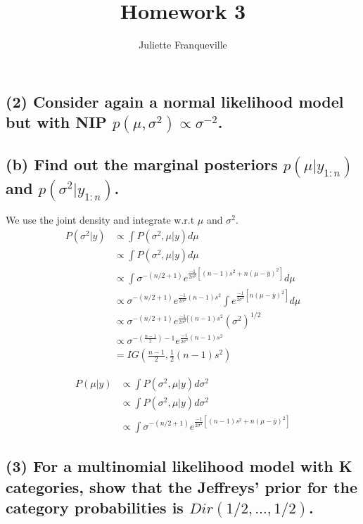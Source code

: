 \documentclass[11pt]{article}
\begin{document}
 
\title{Homework 3}
\author{Juliette Franqueville\\
}
\maketitle

\subsection*{(2) Consider again a normal likelihood model but with NIP $p(\mu, \sigma^2) \propto \sigma^{-2}$.}

\subsection*{(b) Find out the marginal posteriors $p(\mu |y_{1:n})$ and $p(\sigma^2 |y_{1:n})$.}

We use the joint density and integrate w.r.t $\mu$ and $\sigma^2$.
\begin{align*}
    P(\sigma^2|y) &\propto \int P(\sigma^2, \mu|y)d\mu \\
    &\propto \int P(\sigma^2, \mu|y)d\mu \\
    &\propto \int \sigma^{-(n/2 + 1)}e^{\frac{-1}{2\sigma^2}[(n-1)s^2+n(\mu-\bar{y})^2]}d\mu \\
    &\propto \sigma^{-(n/2 + 1)}e^{\frac{-1}{2\sigma^2}(n-1)s^2} \int e^{\frac{-1}{2\sigma^2}[n(\mu-\bar{y})^2]}d\mu \\
     &\propto \sigma^{-(n/2 + 1)}e^{\frac{-1}{2\sigma^2}[(n-1)s^2} (\sigma^2)^{1/2} \\
     &\propto \sigma^{-\left(\frac{n-1}{2}\right)- 1}e^{\frac{-1}{2\sigma^2}(n-1)s^2}\\
     &= IG\left( \frac{n-1}{2}, \frac{1}{2}(n-1)s^2\right)
\end{align*}


\begin{align*}
    P(\mu|y) &\propto \int P(\sigma^2, \mu|y)d\sigma^2 \\
    &\propto \int P(\sigma^2, \mu|y)d\sigma^2 \\
    &\propto \int \sigma^{-(n/2 + 1)}e^{\frac{-1}{2\sigma^2}[(n-1)s^2+n(\mu-\bar{y})^2]}
\end{align*}

\subsection*{(3) For a multinomial likelihood model with K categories, show that the Jeffreys’ prior for the category probabilities is $Dir(1/2, \ldots, 1/2)$.}
\end{document}
